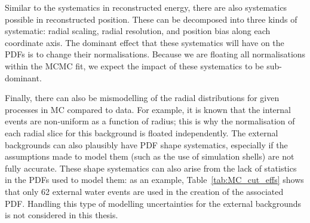 Similar to the systematics in reconstructed energy, there are also systematics possible in reconstructed position. These can be decomposed into three kinds of systematic: radial scaling, radial resolution, and position bias along each coordinate axis. The dominant effect that these systematics will have on the PDFs is to change their normalisations. Because we are floating all normalisations within the MCMC fit, we expect the impact of these systematics to be sub-dominant. 

Finally, there can also be mismodelling of the radial distributions for given processes in MC compared to data. For example, it is known that the internal  events are non-uniform as a function of radius; this is why the normalisation of each radial slice for this background is floated independently. The external backgrounds can also plausibly have PDF shape systematics, especially if the assumptions made to model them (such as the use of simulation shells) are not fully accurate. These shape systematics can also arise from the lack of statistics in the PDFs used to model them: as an example, Table~\ref{tab:MC_cut_effs} shows that only 62 external water  events are used in the creation of the associated PDF. Handling this type of modelling uncertainties for the external backgrounds is not considered in this thesis.




